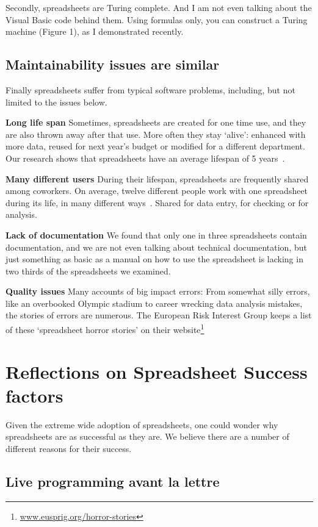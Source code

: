 \documentclass[conference]{IEEEtran}
\begin{document}
Secondly, spreadsheets are Turing complete. And I am not even talking about the Visual Basic code behind them. Using formulas only, you can construct a Turing machine (Figure 1), as I demonstrated recently. 

\subsection{Maintainability issues are similar}

Finally spreadsheets suffer from typical software problems, including, but not limited to the issues below.

\textbf{Long life span} Sometimes, spreadsheets are created for one time use, and they are also thrown away after that use. More often they stay ‘alive’: enhanced with more data, reused for next year's budget or modified for a different department. Our research shows that spreadsheets have an average lifespan of 5 years~\cite{Hermans2011}.

\textbf{Many different users} During their lifespan, spreadsheets are frequently shared among coworkers. On average, twelve different people work with one spreadsheet during its life, in many different ways~\cite{Hermans2011}. Shared for data entry, for checking or for analysis.

\textbf{Lack of documentation} We found that only one in three spreadsheets  contain documentation, and we are not even talking about technical documentation, but just something as basic as a manual on how to use the spreadsheet is lacking in two thirds of the spreadsheets we examined.

\textbf{Quality issues} Many accounts of big impact errors: From somewhat silly errors, like an overbooked Olympic stadium to career wrecking data analysis mistakes, the stories of errors are numerous. The European Risk Interest Group keeps a list of these ‘spreadsheet horror stories’ on their website\footnote{\url{www.eusprig.org/horror-stories}}

\section{Reflections on Spreadsheet Success factors}
Given the extreme wide adoption of spreadsheets, one could wonder why spreadsheets are as successful as they are. We believe there are a number of different reasons for their success.

\subsection{Live programming avant la lettre}
\end{document}
